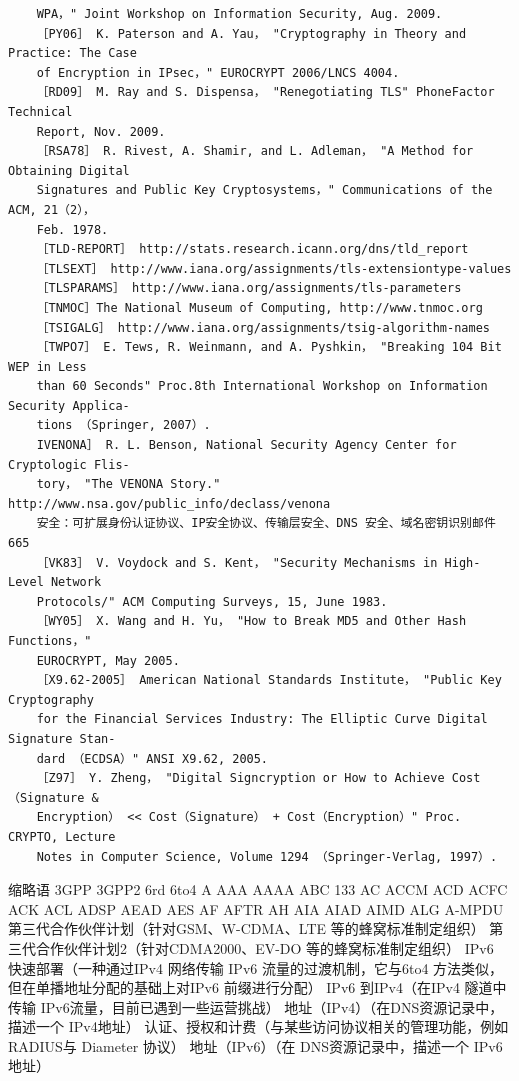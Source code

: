 \begin{verbatim}
    WPA，" Joint Workshop on Information Security, Aug. 2009.
    ［PY06］ K. Paterson and A. Yau， "Cryptography in Theory and Practice: The Case
    of Encryption in IPsec，" EUROCRYPT 2006/LNCS 4004.
    ［RD09］ M. Ray and S. Dispensa， "Renegotiating TLS" PhoneFactor Technical
    Report, Nov. 2009.
    ［RSA78］ R. Rivest, A. Shamir, and L. Adleman， "A Method for Obtaining Digital
    Signatures and Public Key Cryptosystems，" Communications of the ACM, 21（2），
    Feb. 1978.
    ［TLD-REPORT］ http://stats.research.icann.org/dns/tld_report
    ［TLSEXT］ http://www.iana.org/assignments/tls-extensiontype-values
    ［TLSPARAMS］ http://www.iana.org/assignments/tls-parameters
    ［TNMOC］The National Museum of Computing, http://www.tnmoc.org
    ［TSIGALG］ http://www.iana.org/assignments/tsig-algorithm-names
    ［TWPO7］ E. Tews, R. Weinmann, and A. Pyshkin， "Breaking 104 Bit WEP in Less
    than 60 Seconds" Proc.8th International Workshop on Information Security Applica-
    tions （Springer, 2007）.
    IVENONA］ R. L. Benson, National Security Agency Center for Cryptologic Flis-
    tory， "The VENONA Story." http://www.nsa.gov/public_info/declass/venona
    安全：可扩展身份认证协议、IP安全协议、传输层安全、DNS 安全、域名密钥识别邮件665
    ［VK83］ V. Voydock and S. Kent， "Security Mechanisms in High-Level Network
    Protocols/" ACM Computing Surveys, 15, June 1983.
    ［WY05］ X. Wang and H. Yu， "How to Break MD5 and Other Hash Functions，"
    EUROCRYPT, May 2005.
    ［X9.62-2005］ American National Standards Institute， "Public Key Cryptography
    for the Financial Services Industry: The Elliptic Curve Digital Signature Stan-
    dard （ECDSA）" ANSI X9.62, 2005.
    ［Z97］ Y. Zheng， "Digital Signcryption or How to Achieve Cost（Signature &
    Encryption） << Cost（Signature） + Cost（Encryption）" Proc. CRYPTO, Lecture
    Notes in Computer Science, Volume 1294 （Springer-Verlag, 1997）.
\end{verbatim}
缩略语
3GPP
3GPP2
6rd
6to4
A
AAA
AAAA
ABC
133
AC
ACCM
ACD
ACFC
ACK
ACL
ADSP
AEAD
AES
AF
AFTR
AH
AIA
AIAD
AIMD
ALG
A-MPDU
第三代合作伙伴计划（针对GSM、W-CDMA、LTE 等的蜂窝标准制定组织）
第三代合作伙伴计划2（针对CDMA2000、EV-DO 等的蜂窝标准制定组织）
IPv6 快速部署（一种通过IPv4 网络传输 IPv6 流量的过渡机制，它与6to4
方法类似，但在单播地址分配的基础上对IPv6 前缀进行分配）
IPv6 到IPv4（在IPv4 隧道中传输 IPv6流量，目前已遇到一些运营挑战）
地址（IPv4）（在DNS资源记录中，描述一个 IPv4地址）
认证、授权和计费（与某些访问协议相关的管理功能，例如 RADIUS与
Diameter 协议）
地址（IPv6）（在 DNS资源记录中，描述一个 IPv6地址）
